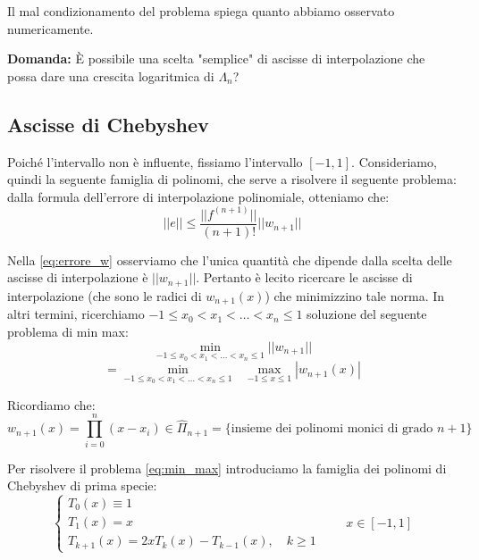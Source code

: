     \vspace{0.3cm}
    Il mal condizionamento del problema spiega quanto abbiamo osservato numericamente.
    
    \vspace{0.3cm}
    \textbf{Domanda:} È possibile una scelta "semplice" di ascisse di interpolazione che possa dare una crescita logaritmica di $\Lambda_n$?








\vspace{1cm}

\subsection{Ascisse di Chebyshev}
Poiché l'intervallo non è influente, fissiamo l'intervallo $[-1,1]$.
Consideriamo, quindi la seguente famiglia di polinomi, che serve a risolvere il seguente problema: dalla formula dell'errore di interpolazione polinomiale, otteniamo che:
\begin{equation} \label{eq:errore_w}
||e|| \le \frac{||f^{(n+1)}||}{(n+1)!} ||w_{n+1}||
\end{equation}

Nella \eqref{eq:errore_w} osserviamo che l'unica quantità che dipende dalla scelta delle ascisse di interpolazione è $||w_{n+1}||$.
Pertanto è lecito ricercare le ascisse di interpolazione (che sono le radici di $w_{n+1}(x)$) che minimizzino tale norma.
In altri termini, ricerchiamo
$-1 \le x_0 < x_1 < \dots < x_n \le 1$ soluzione del seguente problema di min max:
$$ \min_{-1 \le x_0 < x_1 < \dots < x_n \le 1} ||w_{n+1}|| $$
\begin{equation} \label{eq:min_max}
= \min_{-1 \le x_0 < x_1 < \dots < x_n \le 1} \text{ } \max_{-1 \le x \le 1} |w_{n+1}(x)|
\end{equation}

Ricordiamo che:
$$ w_{n+1}(x) = \prod_{i=0}^{n} (x - x_i) \in \hat{\Pi}_{n+1} = \{ \text{insieme dei polinomi monici di grado } n+1 \} $$

Per risolvere il problema \eqref{eq:min_max} introduciamo la famiglia dei polinomi di Chebyshev di prima specie:
\begin{equation} \label{eq:chebyshev}
\begin{cases}
T_0(x) \equiv 1 \\
T_1(x) = x \\
T_{k+1}(x) = 2x T_k(x) - T_{k-1}(x), \quad k \ge 1
\end{cases} \qquad x \in [-1,1]
\end{equation}

